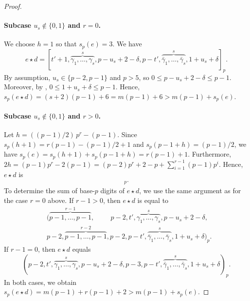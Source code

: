 \documentclass[10pt,a4paper]{amsart}
\newcommand{\comp}[1]{\bar{#1}}
\newcommand{\wt}{s_p}
\begin{document}
\begin{proof}
\paragraph{Subcase $u_s \notin \{0,1\}$ and $r=0$.} We choose $h = 1$ so that $\wt(e) = 3$. We have
\begin{equation}
\label{eq:fail_p5}
e \star d = [t'+1,\overbrace{\gamma_1,\dots,\gamma_s}^s, p-u_s+2-\delta, p-t', \overbrace{\comp{\gamma}_1,\dots,\comp{\gamma}_s}^s,1+u_s+\delta]_p.
\end{equation}
By assumption, $u_s \in \{p-2,p-1\}$ and $p>5$, so $0 \leq p-u_s+2 - \delta \leq p-1$.  Moreover, by , $0 \leq 1+u_s + \delta \leq p-1$. Hence, $\wt(e \star d) = (s+2)(p-1)+6 = m(p-1)+6 > m(p - 1) + \wt(e)$.

\paragraph{Subcase $u_s \notin \{0,1\}$ and $r>0$.}
Let $h = ((p - 1)/2)\,p^r - (p - 1)$. 
Since $\wt(h + 1) = r(p - 1) - (p - 1) / 2 + 1$ and $\wt(p - 1 + h) = (p - 1)/2$, we have $\wt(e) = \wt(h+1) + \wt(p-1+h) = r(p-1) + 1$. Furthermore, $2h = (p - 1) p^r - 2(p - 1) = (p-2)p^r + 2 - p + \sum_{i=1}^{r-1}(p-1)p^i$. Hence, $e \star d$ is
\begin{align*}
[&\overbrace{p-1,\dots,p-1}^{r-1},p-2,\hphantom{p-}\;\,t',\overbrace{\gamma_1,\dots,\gamma_s}^s,2-u_s-\delta, \\ 
&\overbrace{p-1,\dots,p-1}^{r-1},p-2,p-t', \overbrace{\comp{\gamma}_1,\dots,\comp{\gamma}_s}^s,1+u_s+\delta]_p.
\end{align*}
To determine the sum of base-$p$ digits of $e\star d$, we use the same argument as for the case $r=0$ above. If $r-1 > 0$, then $e \star d$ is equal to
\begin{align*}
&(\overbrace{p-1,\dots,p-1}^{r-1},\;\;\;\;\;\;\;\;\,p-2,t',\overbrace{\gamma_1,\dots,\gamma_s}^s, p-u_s+2-\delta,\\ 
&p-2,\overbrace{p-1,\dots,p-1}^{r-2},p-2,p-t', \overbrace{\comp{\gamma}_1,\dots,\comp{\gamma}_s}^s,1+u_s+\delta)_p.
\end{align*}
If $r-1 = 0$, then $e \star d$ equals
\begin{equation*}
(p-2,t',\overbrace{\gamma_1,\dots,\gamma_s}^s,p-u_s+2-\delta, p-3,p-t', \overbrace{\comp{\gamma}_1,\dots,\comp{\gamma}_s}^s,1+u_s+\delta)_p.
\end{equation*}
In both cases, we obtain $\wt(e\star d) = m(p-1) + r(p-1)+2 > m(p - 1) + \wt(e)$. 


\end{proof}
\end{document}
